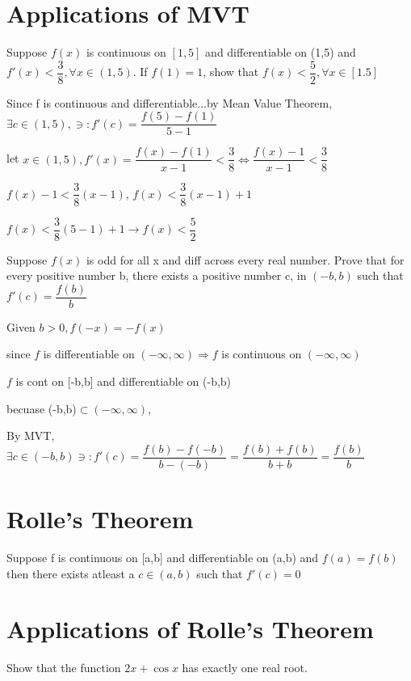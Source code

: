 \documentclass{article}
\begin{document}
\section{Applications of MVT}

Suppose $f(x)$ is continuous on $[1,5]$ and differentiable on (1,5) and $f'(x) < \dfrac{3}{8}, \forall x \in (1,5)$. If $f(1) = 1$, show that $f(x) < \dfrac{5}{2}, \forall x \in [1.5]$

Since f is continuous and differentiable...by Mean Value Theorem, $\exists c \in (1,5), \ni: f'(c) = \dfrac{f(5) - f(1)}{5-1}$

let $x \in (1,5), f'(x) = \dfrac{f(x) - f(1)}{x-1} < \dfrac{3}{8} \Longleftrightarrow \dfrac{f(x) - 1}{x - 1} < \dfrac{3}{8}$

$f(x) - 1 < \dfrac{3}{8}(x - 1)$, $f(x) < \dfrac{3}{8} (x-1) + 1$

$f(x) < \dfrac{3}{8}(5 - 1) + 1 \rightarrow f(x) < \dfrac{5}{2}$ 

\vspace{1cm}

Suppose $f(x)$ is odd for all x and diff across every real number. Prove that for every positive number b, there exists a positive number c, in $(-b,b)$ such that $f'(c) = \dfrac{f(b)}{b}$

Given $b > 0, f(-x) = - f(x)$

since $f$ is differentiable on $(-\infty,\infty) \Longrightarrow f $ is continuous on $(-\infty,\infty)$

$f$ is cont on [-b,b] and differentiable on (-b,b)

becuase (-b,b)$\subset(-\infty, \infty)$,

By MVT, $\exists c \in (-b , b) \ni: f'(c) = \dfrac{f(b) - f(-b)}{b - (-b)} = \dfrac{f(b) + f(b)}{b + b} = \dfrac{f(b)}{b}$

\section{Rolle's Theorem}

Suppose f is continuous on [a,b] and differentiable on (a,b) and $f(a) = f(b)$ then there exists atleast a $c \in (a,b)$ such that $f'(c) = 0$

\section{Applications of Rolle's Theorem}

Show that the function $2x + \cos x$ has exactly one real root.
\end{document}
